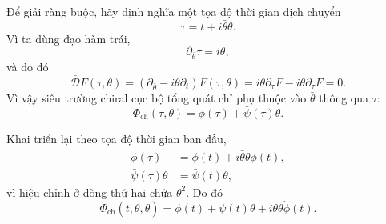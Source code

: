 Để giải ràng buộc, hãy định nghĩa một tọa độ thời gian dịch chuyển
\begin{equation}
\tau=t+i\bar\theta\theta.
\label{eq:l7-chiral-time}
\end{equation}
Vì ta dùng đạo hàm trái,
\begin{equation}
\partial_{\bar\theta}\tau=i\theta,
\end{equation}
và do đó
\begin{equation}
\bar{\mathcal D}F(\tau,\theta)
=\left(\partial_{\bar\theta}-i\theta\partial_t\right)F(\tau,\theta)
=i\theta\partial_\tau F-i\theta\partial_\tau F=0.
\end{equation}
Vì vậy siêu trường chiral cục bộ tổng quát chỉ phụ thuộc vào \(\bar\theta\) thông qua \(\tau\):
\begin{equation}
\Phi_{\mathrm{ch}}(\tau,\theta)
=\phi(\tau)+\bar\psi(\tau)\theta.
\label{eq:l7-chiral-field-tau}
\end{equation}

\begin{classroomqa}
\end{classroomqa}

Khai triển lại theo tọa độ thời gian ban đầu,
\begin{align}
\phi(\tau)
&=\phi(t)+i\bar\theta\theta\dot\phi(t),\\
\bar\psi(\tau)\theta
&=\bar\psi(t)\theta,
\end{align}
vì hiệu chỉnh ở dòng thứ hai chứa \(\theta^2\). Do đó
\begin{equation}
\Phi_{\mathrm{ch}}(t,\theta,\bar\theta)
=\phi(t)+\bar\psi(t)\theta
+i\bar\theta\theta\dot\phi(t).
\label{eq:l7-chiral-field-components}
\end{equation}

\begin{classroomqa}
\end{classroomqa}

